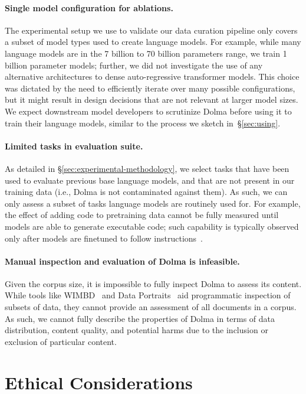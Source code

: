 \documentclass{article}
\newcommand{\dolma}{Dolma\xspace}
\begin{document}
\paragraph{Single model configuration for ablations.} 
The experimental setup we use to validate our data curation pipeline only covers a subset of model types used to create language models. 
For example, while many language models are in the 7 billion to 70 billion parameters range, we train 1 billion parameter models;
further, we did not investigate the use of any alternative architectures to dense auto-regressive transformer models.
This choice was dictated by the need to efficiently iterate over many possible configurations, but it might result in design decisions that are not relevant at larger model sizes.
We expect downstream model developers to scrutinize \dolma before using it to train their language models, similar to the process we sketch in~\S\ref{sec:using}.

\paragraph{Limited tasks in evaluation suite.}
As detailed in \S\ref{sec:experimental-methodology}, we select tasks that have been used to evaluate previous base language models, and that are not present in our training data (i.e., \dolma is not contaminated against them). 
As such, we can only assess a subset of tasks language models are routinely used for. 
For example, the effect of adding code to pretraining data cannot be fully measured until models are able to generate executable code; such capability is typically observed only after models are finetuned to follow instructions~\citep{muennighoff2023octopack,zhuo2024astraios}.  

\paragraph{Manual inspection and evaluation of \dolma is infeasible.}
Given the corpus size, it is impossible to fully inspect \dolma to assess its content. 
While tools like WIMBD~\citep{wimbd} and Data Portraits~\citep{Marone2023DataPR} aid programmatic inspection of subsets of data, they cannot provide an assessment of all documents in a corpus. 
As such, we cannot fully describe the properties of \dolma in terms of data distribution, content quality, and potential harms due to the inclusion or exclusion of particular content.

\section*{Ethical Considerations}
\label{sec:ethics}
\end{document}
